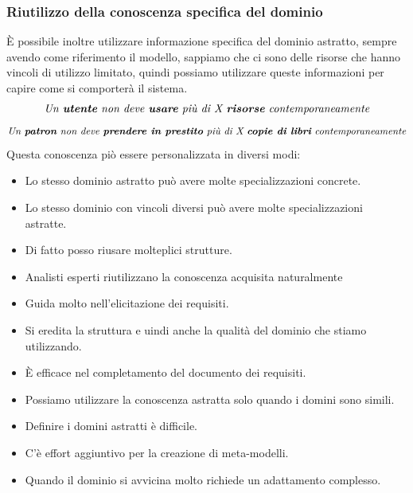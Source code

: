 \subsubsection{Riutilizzo della conoscenza specifica del dominio}
È possibile inoltre utilizzare informazione specifica del dominio astratto, 
sempre avendo come riferimento il modello, sappiamo che ci sono delle risorse che
hanno vincoli di utilizzo limitato, quindi possiamo utilizzare queste informazioni
per capire come si comporterà il sistema.
\[
\textit{Un \textbf{utente} non deve \textbf{usare} più di X \textbf{risorse}
contemporaneamente}
\] 
\[
\textit{Un \textbf{patron} non deve \textbf{prendere in prestito} più di X
\textbf{copie di libri} contemporaneamente}
\]
Questa conoscenza piò essere personalizzata in diversi modi:
\begin{itemize}
    \item Lo stesso dominio astratto può avere molte specializzazioni concrete.
    \item Lo stesso dominio con vincoli diversi può avere molte specializzazioni astratte.
    \item Di fatto posso riusare molteplici strutture.
\end{itemize}
\begin{tcolorbox}[colback=green!5!white,colframe=green!75!black, title=Pro del riutilizzo della conoscenza]
    \begin{itemize}
        \item Analisti esperti riutilizzano la conoscenza acquisita naturalmente
        \item Guida molto nell'elicitazione dei requisiti.
        \item Si eredita la struttura e uindi anche la qualità del dominio che stiamo 
        utilizzando.
        \item È efficace nel completamento del documento dei requisiti.
    \end{itemize}
\end{tcolorbox}
\begin{tcolorbox}[colback=red!5!white,colframe=red!75!black, title=Contro del riutilizzo della conoscenza]
    \begin{itemize}
        \item Possiamo utilizzare la conoscenza astratta solo quando i domini sono
        simili.
        \item Definire i domini astratti è difficile.
        \item C'è effort aggiuntivo per la creazione di meta-modelli.
        \item Quando il dominio si avvicina molto richiede un adattamento complesso.
    \end{itemize}
\end{tcolorbox}
